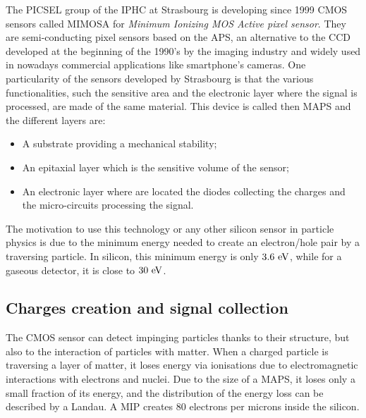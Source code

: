 
  The PICSEL group of the IPHC at Strasbourg is developing since 1999 CMOS sensors called MIMOSA for \textit{Minimum Ionizing MOS Active pixel sensor}. 
  They are semi-conducting pixel sensors based on the \gls{APS}, an alternative to the \gls{CCD} developed at the beginning of the 1990's by the imaging industry and widely used in nowadays commercial applications like smartphone's cameras.
  One particularity of the sensors developed by Strasbourg is that the various functionalities, such the sensitive area and the electronic layer where the signal is processed, are made of the same material.
  This device is called then \acrfull{MAPS} and the different layers are:
  \begin{itemize}
    \item A substrate providing a mechanical stability;
    \item An epitaxial layer which is the sensitive volume of the sensor;
    \item An electronic layer where are located the diodes collecting the charges and the micro-circuits processing the signal.
  \end{itemize}

  The motivation to use this technology or any other silicon sensor in particle physics is due to the minimum energy needed to create an electron/hole pair by a traversing particle.
  In silicon, this minimum energy is only $3.6~\rm{eV}$, while for a gaseous detector, it is close to $30~\rm{eV}$.

    \subsection{Charges creation and signal collection}   

    The \gls{CMOS} sensor can detect impinging particles thanks to their structure, but also to the interaction of particles with matter.
    When a charged particle is traversing a layer of matter, it loses energy via ionisations due to electromagnetic interactions with electrons and nuclei.
    Due to the size of a \gls{MAPS}, it loses only a small fraction of its energy, and the distribution of the energy loss can be described by a Landau.
    A \gls{MIP} creates 80 electrons per microns inside the silicon.

